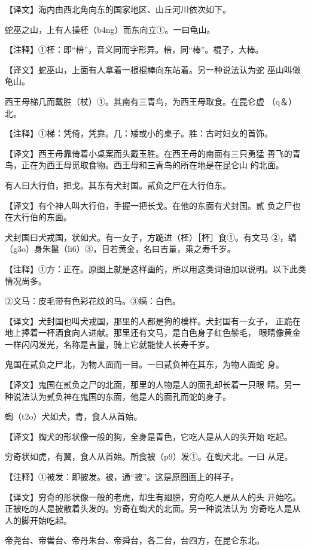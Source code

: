 \documentclass[a4paper,12pt,UTF8,twoside]{ctexbook}
\begin{document}
【译文】海内由西北角向东的国家地区、山丘河川依次如下。

蛇巫之山，上有人操柸（b4ng）而东向立①。一曰龟山。

【注释】①柸：即“棓”，音义同而字形异。棓，同“棒”。棍子，大棒。

【译文】蛇巫山，上面有人拿着一根棍棒向东站着。另一种说法认为蛇 巫山叫做龟山。

西王母梯几而戴胜（杖）①。其南有三青鸟，为西王母取食。在昆仑虚 （q＆）北。

【注释】①梯：凭倚，凭靠。几：矮或小的桌子。胜：古时妇女的首饰。

【译文】西王母靠倚着小桌案而头戴玉胜。在西王母的南面有三只勇猛 善飞的青鸟，正在为西王母觅取食物。西王母和三青鸟的所在地是在昆仑山 的北面。

有人曰大行伯，把戈。其东有犬封国。贰负之尸在大行伯东。

【译文】有个神人叫大行伯，手握一把长戈。在他的东面有犬封国。贰 负之尸也在大行伯的东面。

犬封国曰犬戎国，状如犬。有一女子，方跪进（柸）［杯］食①。有文马 ②，缟（g3o）身朱鬣（li6）③，目若黄金，名曰吉量，乘之寿千岁。

【注释】①方：正在。原图上就是这样画的，所以用这类词语加以说明。以下此类情况尚多。

②文马：皮毛带有色彩花纹的马。③缟：白色。

【译文】犬封国也叫犬戎国，那里的人都是狗的模样。犬封国有一女子， 正跪在地上捧着一杯酒食向人进献。那里还有文马，是白色身子红色鬃毛， 眼睛像黄金一样闪闪发光，名称是吉量，骑上它就能使人长寿千岁。

鬼国在贰负之尸北，为物人面而一目。一曰贰负神在其东，为物人面蛇 身。

【译文】鬼国在贰负之尸的北面，那里的人物是人的面孔却长着一只眼 睛。另一种说法认为贰负神在鬼国的东面，他是人的面孔而蛇的身子。

蜪（t2o）犬如犬，青，食人从首始。

【译文】蜪犬的形状像一般的狗，全身是青色，它吃人是从人的头开始 吃起。

穷奇状如虎，有翼，食人从首始。所食被（p9）发①。在蜪犬北。一曰 从足。

【注释】①被发：即披发。被，通“披”。这是原图画上的样子。

【译文】穷奇的形状像一般的老虎，却生有翅膀，穷奇吃人是从人的头 开始吃。正被吃的人是披散着头发的。穷奇在蜪犬的北面。另一种说法认为 穷奇吃人是从人的脚开始吃起。

帝尧台、帝喾台、帝丹朱台、帝舜台，各二台，台四方，在昆仑东北。
\end{document}
